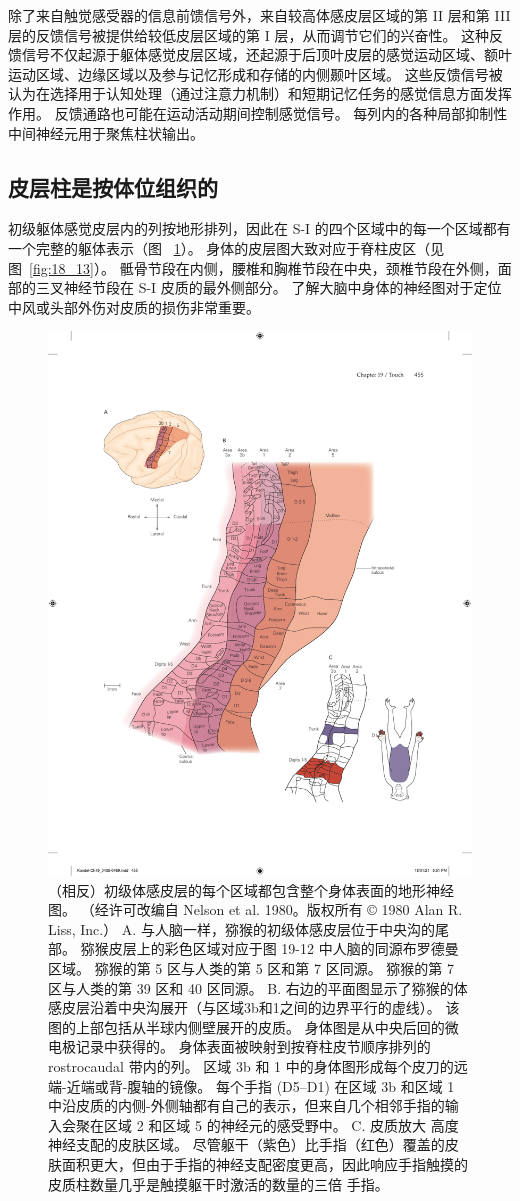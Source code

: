 除了来自触觉感受器的信息前馈信号外，来自较高体感皮层区域的第 II 层和第 III 层的反馈信号被提供给较低皮层区域的第 I 层，从而调节它们的兴奋性。
这种反馈信号不仅起源于躯体感觉皮层区域，还起源于后顶叶皮层的感觉运动区域、额叶运动区域、边缘区域以及参与记忆形成和存储的内侧颞叶区域。
这些反馈信号被认为在选择用于认知处理（通过注意力机制）和短期记忆任务的感觉信息方面发挥作用。
反馈通路也可能在运动活动期间控制感觉信号。
每列内的各种局部抑制性中间神经元用于聚焦柱状输出。



\subsection{皮层柱是按体位组织的}

初级躯体感觉皮层内的列按地形排列，因此在 S-I 的四个区域中的每一个区域都有一个完整的躯体表示（图 ~\ref{fig:19_15}）。
身体的皮层图大致对应于脊柱皮区（见图~\ref{fig:18_13}）。
骶骨节段在内侧，腰椎和胸椎节段在中央，颈椎节段在外侧，面部的三叉神经节段在 S-I 皮质的最外侧部分。
了解大脑中身体的神经图对于定位中风或头部外伤对皮质的损伤非常重要。


\begin{figure}[htbp]
	\centering
	\includegraphics[width=0.5\linewidth]{chap19/fig_19_15}
	\caption{（相反）初级体感皮层的每个区域都包含整个身体表面的地形神经图。 （经许可改编自 Nelson et al. 1980。版权所有 © 1980 Alan R. Liss, Inc.）
		A. 与人脑一样，猕猴的初级体感皮层位于中央沟的尾部。
		猕猴皮层上的彩色区域对应于图 19-12 中人脑的同源布罗德曼区域。
		猕猴的第 5 区与人类的第 5 区和第 7 区同源。
		猕猴的第 7 区与人类的第 39 区和 40 区同源。
		B. 右边的平面图显示了猕猴的体感皮层沿着中央沟展开（与区域3b和1之间的边界平行的虚线）。
		该图的上部包括从半球内侧壁展开的皮质。
		身体图是从中央后回的微电极记录中获得的。
		身体表面被映射到按脊柱皮节顺序排列的 rostrocaudal 带内的列。
		区域 3b 和 1 中的身体图形成每个皮刀的远端-近端或背-腹轴的镜像。
		每个手指 (D5–D1) 在区域 3b 和区域 1 中沿皮质的内侧-外侧轴都有自己的表示，但来自几个相邻手指的输入会聚在区域 2 和区域 5 的神经元的感受野中。
		C. 皮质放大 高度神经支配的皮肤区域。
		尽管躯干（紫色）比手指（红色）覆盖的皮肤面积更大，但由于手指的神经支配密度更高，因此响应手指触摸的皮质柱数量几乎是触摸躯干时激活的数量的三倍 手指。}
	\label{fig:19_15}
\end{figure}


